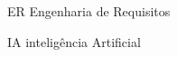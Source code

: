 \begin{siglas}
  \item[ER] Engenharia de Requisitos
  \item[IA] inteligência Artificial
\end{siglas}
